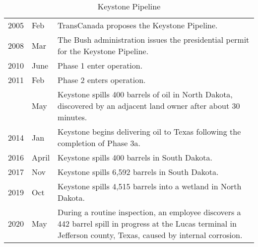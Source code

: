 
\begin{table}[H]
	\caption{Keystone Pipeline}
	\label{table:keystone}

	\begin{tabularx}{\textwidth}{r @{\hspace{0.5\tabcolsep}} l |@{\timeline} X}
		\toprule

		2005 & Feb & TransCanada proposes the Keystone Pipeline.\\

		2008 & Mar & The Bush administration issues the presidential permit for the Keystone Pipeline.\parnote{\url{https://2001-2009.state.gov/r/pa/prs/ps/2008/mar/102254.htm}}\\

		2010 & June & Phase 1 enter operation.\\

		2011 & Feb & Phase 2 enters operation.\\

		 & May & Keystone spills 400 barrels of oil in North Dakota, discovered by an adjacent land owner after about 30 minutes.\parnote{\url{https://www.thedickinsonpress.com/business/energy-and-mining/4004561-5-years-after-spill-rancher-and-pipeline-junkie-still-has}}\\

		2014 & Jan & Keystone begins delivering oil to Texas following the completion of Phase 3a.\\

		2016 & April & Keystone spills 400 barrels in South Dakota.\parnote{\url{https://www.usnews.com/news/articles/2016-04-08/keystone-pipeline-leak-worse-than-thought}}\\

		2017 & Nov & Keystone spills 6,592 barrels in South Dakota.\\

		2019 & Oct & Keystone spills 4,515 barrels into a wetland in North Dakota.\parnote{\url{https://www.nytimes.com/2019/10/31/us/keystone-pipeline-leak.html}}\\

		2020 & May & During a routine inspection, an employee discovers a 442 barrel spill in progress at the Lucas terminal in Jefferson county, Texas, caused by internal corrosion.\parnote{\url{https://www.jbarg.net/posts/2021-04-02-keystone-spill-without-media-coverage/}}\\

	\end{tabularx}
\parnotes
\end{table}